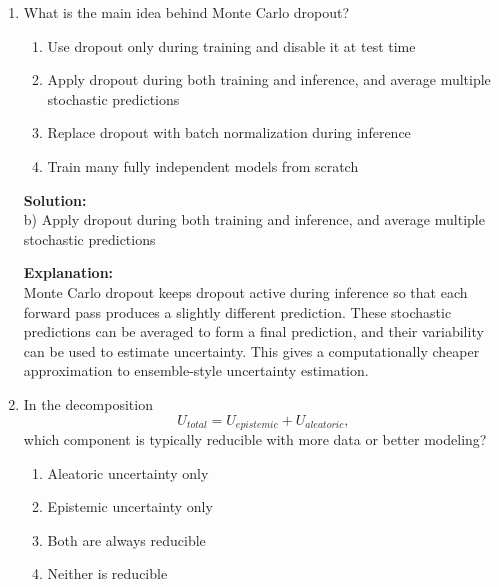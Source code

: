 \documentclass{article}
\begin{document}
\begin{enumerate}
\textbf{Explanation:} \\
Deep ensembles estimate uncertainty by training multiple models with different initializations and aggregating their predictions. The variation across these predictions provides information about model uncertainty. Since multiple models or passes are involved, this falls under iterative uncertainty estimation.

\vspace{2mm}

\item What is the main idea behind Monte Carlo dropout?

\begin{enumerate}
    \item Use dropout only during training and disable it at test time
    \item Apply dropout during both training and inference, and average multiple stochastic predictions
    \item Replace dropout with batch normalization during inference
    \item Train many fully independent models from scratch
\end{enumerate}

\textbf{Solution:} \\
b) Apply dropout during both training and inference, and average multiple stochastic predictions

\textbf{Explanation:} \\
Monte Carlo dropout keeps dropout active during inference so that each forward pass produces a slightly different prediction. These stochastic predictions can be averaged to form a final prediction, and their variability can be used to estimate uncertainty. This gives a computationally cheaper approximation to ensemble-style uncertainty estimation.

\vspace{2mm}

\item In the decomposition
\[
U_{total} = U_{epistemic} + U_{aleatoric},
\]
which component is typically reducible with more data or better modeling?

\begin{enumerate}
    \item Aleatoric uncertainty only
    \item Epistemic uncertainty only
    \item Both are always reducible
    \item Neither is reducible
\end{enumerate}


\end{enumerate}
\end{document}
